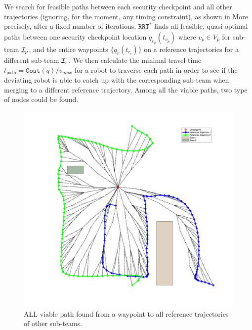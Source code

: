 \documentclass[journal]{IEEEtran}  %
\newcommand{\rrtstar}{$\texttt{RRT}^\texttt{*}$}
\begin{document}
We search for feasible paths between each security checkpoint and all other trajectories (ignoring, for the moment, any timing constraint), as shown in 
More precisely, after a fixed number of  iterations, \rrtstar{}  finds all feasible, quasi-optimal paths between one security checkpoint location $q_{v_p}(t_{v_p})$ where $v_{p} \in V_{p}$ for sub-team $\mathcal{I}_p$, and the entire waypoints $\{q_{r}(t_{{r}_{i}}) \}$ on a reference trajectories for a different sub-team $\mathcal{I}_{r}$.
We then calculate the minimal travel time $t_{\textrm{path}}=\texttt{Cost}(q)/v_{max}$ for a robot to traverse each path in order to see if the deviating robot is able to catch up with the corresponding sub-team when merging to a different reference trajectory. Among all the viable paths, two type of nodes could be found.
\begin{figure}
  \begin{center}
    \includegraphics[width=0.6\linewidth]{RRT_example_new}
\caption{ALL viable path found from a waypoint to all reference trajectories of other sub-teams.}
\label{fig:RRT*}
  \end{center}
\end{figure}
\end{document}
